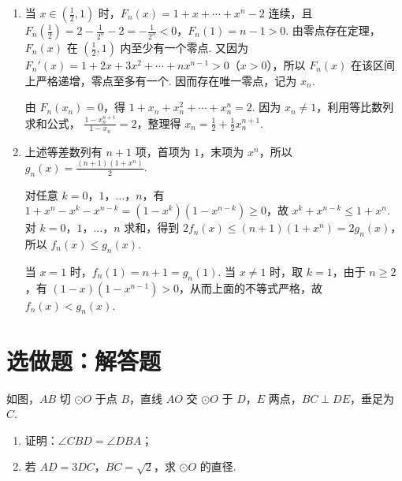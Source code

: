 \begin{solution}
\begin{enumerate}
\item 当 \(x\in\left(\frac{1}{2},1\right)\) 时，\(F_n(x)=1+x+\cdots+x^n-2\) 连续，且
\(F_n\left(\frac{1}{2}\right)=2-\frac{1}{2^n}-2=-\frac{1}{2^n}<0\)，\(F_n(1)=n-1>0\). 由零点存在定理，\(F_n(x)\) 在 \(\left(\frac{1}{2},1\right)\) 内至少有一个零点.
又因为
\(F_n'(x)=1+2x+3x^{2}+\cdots+nx^{n-1}>0\)（\(x>0\)），所以 \(F_n(x)\) 在该区间上严格递增，零点至多有一个. 因而存在唯一零点，记为 \(x_n\).

由 \(F_n(x_n)=0\)，得
\(1+x_n+x_n^{2}+\cdots+x_n^{n}=2\). 因为 \(x_n\ne1\)，利用等比数列求和公式，
\(\frac{1-x_n^{n+1}}{1-x_n}=2\)，整理得 \(x_n=\frac{1}{2}+\frac{1}{2}x_n^{n+1}\).

\item 上述等差数列有 \(n+1\) 项，首项为 \(1\)，末项为 \(x^n\)，所以
\(g_n(x)=\frac{(n+1)(1+x^n)}{2}\).

对任意 \(k=0\)，\(1\)，\(\ldots\)，\(n\)，有
\(1+x^n-x^k-x^{n-k}=(1-x^k)(1-x^{n-k})\geqslant0\)，故
\(x^k+x^{n-k}\leqslant1+x^n\). 对 \(k=0\)，\(1\)，\(\ldots\)，\(n\) 求和，得到
\(2f_n(x)\leqslant(n+1)(1+x^n)=2g_n(x)\)，所以 \(f_n(x)\leqslant g_n(x)\).

当 \(x=1\) 时，\(f_n(1)=n+1=g_n(1)\). 当 \(x\ne1\) 时，取 \(k=1\)，由于 \(n\geqslant2\)，有
\((1-x)(1-x^{n-1})>0\)，从而上面的不等式严格，故 \(f_n(x)<g_n(x)\).
\end{enumerate}
\end{solution}

\section{选做题：解答题}

\begin{problem}
如图，\(AB\) 切 \(\odot O\) 于点 \(B\)，直线 \(AO\) 交 \(\odot O\) 于 \(D\)，\(E\) 两点，\(BC \perp DE\)，垂足为 \(C\).

\begin{enumerate}
\item 证明：\(\angle CBD = \angle DBA\)；
\item 若 \(AD = 3DC\)，\(BC = \sqrt{2}\)，求 \(\odot O\) 的直径.
\end{enumerate}

\end{problem}

